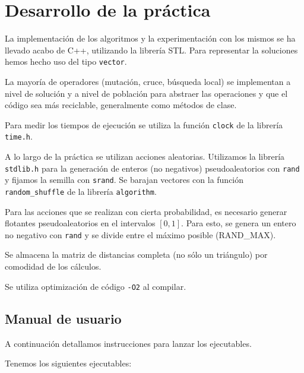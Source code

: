 \documentclass{article}
\begin{document}
\pagebreak

\section{Desarrollo de la práctica}

La implementación de los algoritmos y la experimentación con los mismos se ha llevado acabo de C++, utilizando la librería STL. 
Para representar la soluciones hemos hecho uso del tipo \texttt{vector}.

La mayoría de operadores (mutación, cruce, búsqueda local) se implementan a nivel de solución y a nivel de población para abstraer
las operaciones y que el código sea más reciclable, generalmente como métodos de clase.

Para medir los tiempos de ejecución se utiliza la función \texttt{clock} de la librería \texttt{time.h}.

A lo largo de la práctica se utilizan acciones aleatorias. Utilizamos la librería \texttt{stdlib.h} para la generación de
enteros (no negativos) pseudoaleatorios con \texttt{rand} y fijamos la semilla con \texttt{srand}. Se barajan vectores con la función
 \texttt{random\_shuffle} de la librería \texttt{algorithm}.
 
Para las acciones que se realizan con cierta probabilidad, es necesario generar flotantes pseudoaleatorios en el intervalos $[0,1]$.
Para esto, se genera un entero no negativo con \texttt{rand} y se divide entre el máximo posible (RAND\_MAX).

Se almacena la matriz de distancias completa (no sólo un triángulo) por comodidad de los cálculos.

Se utiliza optimización de código \texttt{-O2} al compilar.

\subsection{Manual de usuario}

A continuación detallamos instrucciones para lanzar los ejecutables.

Tenemos los siguientes ejecutables:
\end{document}
